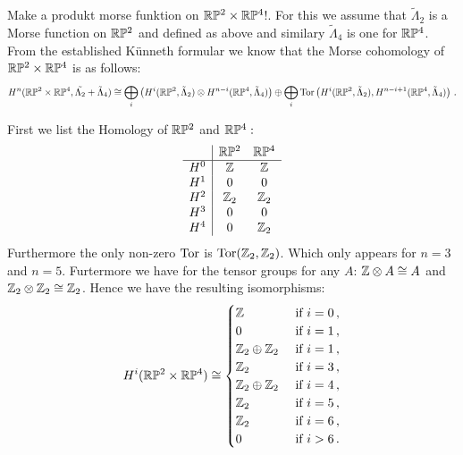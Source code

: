 	\begin{example}
		Make a produkt morse funktion on $\mathbb{R}\mathbb{P}^2\times \mathbb{R}\mathbb{P}^4$!. 
		For this we assume that $\tilde{\Lambda}_2$ is a Morse function on $\mathbb{R}\mathbb{P}^2$ and defined as above and similary $\tilde{\Lambda}_4$ is one for $\mathbb{R}\mathbb{P}^4$.
		From the established Künneth formular we know that the Morse cohomology of $\mathbb{R}\mathbb{P}^2 \times \mathbb{R}\mathbb{P}^4$ is as follows: 
		\begin{equation*}
			H^n(\mathbb{R}\mathbb{P}^2\times \mathbb{R}\mathbb{P}^4,\tilde{\Lambda_2}+\tilde{\Lambda}_4)\cong \bigoplus_i\left(
			H^i(\mathbb{R}\mathbb{P}^2,\tilde{\Lambda}_2)\otimes H^{n-i} (\mathbb{R}\mathbb{P}^4,\tilde{\Lambda}_4)
			\right) \oplus \bigoplus_i \operatorname{\mathrm{Tor}}\left(
			H^i(\mathbb{R}\mathbb{P}^2,\tilde{\Lambda}_2),
			 H^{n-i+1} (\mathbb{R}\mathbb{P}^4,\tilde{\Lambda}_4)
			\right)\,.
		\end{equation*}
		
		First we list the Homology of $\mathbb{R}\mathbb{P}^2$ and $\mathbb{R}\mathbb{P}^4:$
	\begin{equation*}
		\begin{array}{c|c c}
			& \mathbb{R}\mathbb{P}^2 &\mathbb{R}\mathbb{P}^4\\
			\hline
			H^0&\mathbb{Z}&\mathbb{Z} \\
			H^1&0&0\\
			H^2&\mathbb{Z}_2&\mathbb{Z}_2\\
			H^3&0&0\\
			H^4&0&\mathbb{Z}_2
		\end{array}
	\end{equation*}
 Furthermore the only non-zero $\operatorname{\mathrm{Tor}}$ is $\operatorname{\mathrm{Tor}}(\mathbb{Z}_2,\mathbb{Z}_2)$. Which only appears for $n=3$ and $n=5$. Furtermore we have for the tensor groups for any $A$: $\mathbb{Z}\otimes A\cong A$ and $\mathbb{Z}_2\otimes \mathbb{Z}_2 \cong \mathbb{Z}_2$.  Hence we have the resulting isomorphisms: 
 \begin{equation*}
 	H^i(\mathbb{R}\mathbb{P}^2\times \mathbb{R}\mathbb{P}^4)\cong \begin{cases}
 		\mathbb{Z} & \text{ if }i=  0\,,\\
	 	0  & \text{ if }i=  1\,,\\
	 	\mathbb{Z}_2\oplus \mathbb{Z}_2& \text{ if }i=  1\,,\\
	 	\mathbb{Z}_2 & \text{ if }i=  3\,,\\
	 	\mathbb{Z}_2\oplus \mathbb{Z}_2 & \text{ if }i=  4\,,\\
	 	\mathbb{Z}_2& \text{ if }i=  5\,,\\
	 	\mathbb{Z}_2& \text{ if }i=  6\,,\\
	 	0& \text{ if }i>6\,.
 	\end{cases}
 \end{equation*}
	
	\end{example}
	